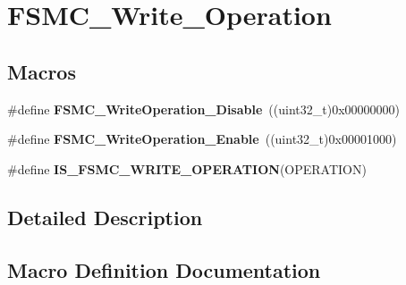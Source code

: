 \hypertarget{group___f_s_m_c___write___operation}{}\section{F\+S\+M\+C\+\_\+\+Write\+\_\+\+Operation}
\label{group___f_s_m_c___write___operation}
\subsection*{Macros}
\begin{DoxyCompactItemize}
\item 
\hypertarget{group___f_s_m_c___write___operation_ga74176320484248f06abae854170f9d9f}{}\#define {\bfseries F\+S\+M\+C\+\_\+\+Write\+Operation\+\_\+\+Disable}~((uint32\+\_\+t)0x00000000)\label{group___f_s_m_c___write___operation_ga74176320484248f06abae854170f9d9f}

\item 
\hypertarget{group___f_s_m_c___write___operation_ga2478beb6dd8861b34a16b8a57a795e56}{}\#define {\bfseries F\+S\+M\+C\+\_\+\+Write\+Operation\+\_\+\+Enable}~((uint32\+\_\+t)0x00001000)\label{group___f_s_m_c___write___operation_ga2478beb6dd8861b34a16b8a57a795e56}

\item 
\#define {\bfseries I\+S\+\_\+\+F\+S\+M\+C\+\_\+\+W\+R\+I\+T\+E\+\_\+\+O\+P\+E\+R\+A\+T\+I\+O\+N}(O\+P\+E\+R\+A\+T\+I\+O\+N)
\end{DoxyCompactItemize}


\subsection{Detailed Description}


\subsection{Macro Definition Documentation}
\hypertarget{group___f_s_m_c___write___operation_ga87fc20d11761caa66c3e7d77a3a7d3e3}{}
